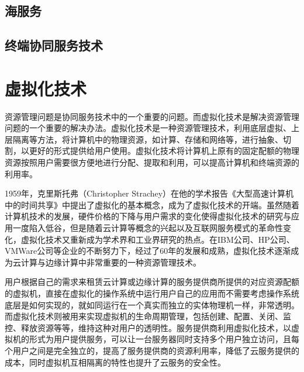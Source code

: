 
\subsection{海服务}

\subsection{终端协同服务技术}



\section{虚拟化技术}\label{sec:related_work_virtualization}
资源管理问题是协同服务技术中的一个重要的问题\citep{文雨2013面向应用服务级目标的虚拟化资源管理}。而虚拟化技术是解决资源管理问题的一个重要的解决办法。虚拟化技术是一种资源管理技术，利用底层虚拟、上层隔离等方法，将计算机中的物理资源，如计算、存储和网络等，进行抽象、切割，以更好的形式提供给用户使用\cite{goth2007virtualization}。虚拟化技术将计算机上原有的固定配额的物理资源按照用户需要很方便地进行分配、提取和利用，可以提高计算机和终端资源的利用率。

1959年，克里斯托弗（Christopher Strachey）在他的学术报告《大型高速计算机中的时间共享》中提出了虚拟化的基本概念，成为了虚拟化技术的开端\citep{本刊编辑部2017虚拟化概述}。虽然随着计算机技术的发展，硬件价格的下降与用户需求的变化使得虚拟化技术的研究与应用一度陷入低谷，但是随着云计算等概念的兴起以及互联网服务模式的革命性变化，虚拟化技术又重新成为学术界和工业界研究的热点\cite{menasce2005virtualization}。在IBM公司、HP公司、VMWare公司等企业的不断努力下，经过了60年的发展和成熟，虚拟化技术逐渐成为云计算与边缘计算中非常重要的一种资源管理技术\cite{pearce2013virtualization,kumar2014review}。

用户根据自己的需求来租赁云计算或边缘计算的服务提供商所提供的对应资源配额的虚拟机，直接在虚拟化的操作系统中运行用户自己的应用而不需要考虑操作系统底层是如何实现的，就如同运行在一个真实而独立的实体物理机一样，非常透明\cite{叶蔚2019基于虚拟化的}。而虚拟化技术则被用来实现虚拟机的生命周期管理，包括创建、配置、关闭、监控、释放资源等等，维持这种对用户的透明性。服务提供商利用虚拟化技术，以虚拟机的形式为用户提供服务，可以让一台服务器同时支持多个用户独立访问，且每个用户之间是完全独立的，提高了服务提供商的资源利用率，降低了云服务提供的成本，同时虚拟机互相隔离的特性也提升了云服务的安全性。

